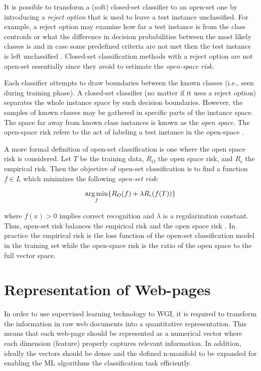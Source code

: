 It is possible to transform a (soft) closed-set classifier to an open-set one by introducing a \textit{reject option} that is used to leave a test instance unclassified. For example, a reject option may examine how far a test instance is from the class centroids or what the difference in decision probabilities between the most likely classes is and in case some predefined criteria are not met then the test instance is left unclassified \parencite{onan2018ensemble}. Closed-set classification methods with a reject option are not open-set essentially since they avoid to estimate the \textit{open-space risk}.

Each classifier attempts to draw boundaries between the known classes (i.e., seen during training phase). A closed-set classifier (no matter if it uses a reject option) separates the whole instance space by such decision boundaries. However, the samples of known classes may be gathered in specific parts of the instance space. The space far away from known class instances is known as the \textit{open space}. The open-space risk refers to the act of labeling a test instance in the open-space \parencite{geng2018recent}. 

A more formal definition of open-set classification is one where the open space risk is considered. Let $T$ be the training data, $R_{O}$ the open space risk, and $R_{\epsilon}$ the empirical risk. Then the objective of open-set classification is to find a function $f \in L$ which minimizes the following \textit{open-set risk}: 

\begin{equation}
\operatorname*{arg\,min}_{f} \{R_{O}(f ) + \lambda R_{\epsilon}(f (T))\}
\end{equation}

\noindent where $f (x) > 0$ implies correct recognition and $\lambda$ is a regularization constant. Thus, open-set risk balances the empirical risk and the open space risk \parencite{geng2018recent}. In practice the empirical risk is the loss function of the open-set classification model in the training set while the open-space risk is the ratio of the open space to the full vector space.

\section{Representation of Web-pages} \label{chap:introduction:sec:document_representation}

In order to use supervised learning technology to WGI, it is required to transform the information in raw web documents into a quantitative representation. This means that each web-page should be represented as a numerical vector where each dimension (feature) properly captures relevant information. In addition, ideally the vectors should be dense and the defined n-manifold to be expanded for enabling the ML algorithms the classification task efficiently. 

